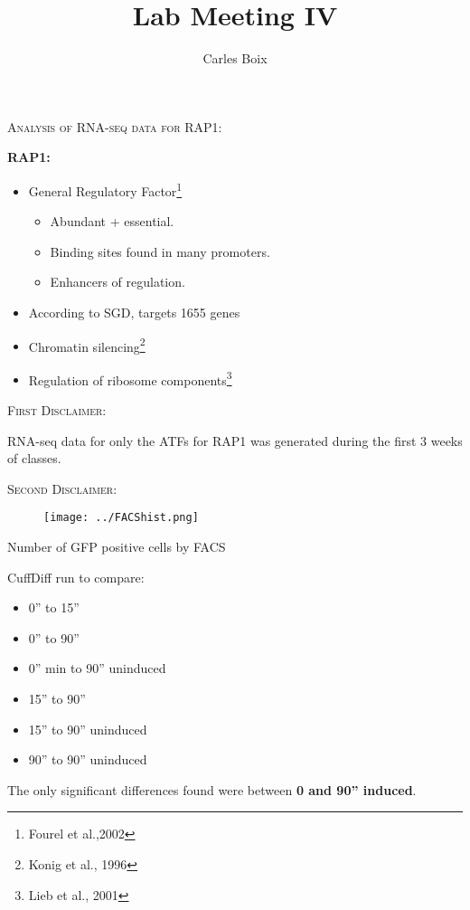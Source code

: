 \documentclass{beamer}
\title[Lab Meeting IV]{Lab Meeting IV}
\author{Carles Boix}
\begin{document}
\begin{frame}
 \begin{center}
        {\large \textsc{Analysis of RNA-seq data for RAP1:}}
    \end{center}

    \textbf{RAP1:}
    \begin{itemize}
        \item General Regulatory Factor\footnote{Fourel et al.,2002}
            \begin{itemize}
                \item Abundant + essential.
                \item Binding sites found in many promoters.
                \item Enhancers of regulation.
            \end{itemize}
        \item According to SGD, targets 1655 genes
        \item Chromatin silencing\footnote{Konig et al., 1996}
        \item Regulation of ribosome components\footnote{Lieb et al., 2001}
    \end{itemize}
\end{frame}
\begin{frame}
    \begin{center}
        {\Large \textsc{First Disclaimer:}}
    \end{center}
    RNA-seq data for only the ATFs for RAP1 was generated during the first 3 weeks of classes.
\end{frame}

\begin{frame}
    \begin{center}
        {\Large \textsc{Second Disclaimer:}}
    \end{center}
    \begin{figure}[ht!]
        \centering
        \texttt{[image: ../FACShist.png]}
        \label{fig:facs}
    \end{figure}
    \begin{center}
        Number of GFP positive cells by FACS
    \end{center}

\end{frame}

\begin{frame}
    CuffDiff run to compare:
    \begin{itemize}
        \item 0'' to 15''
        \item 0'' to 90''
        \item 0''   min to 90'' uninduced
        \item 15'' to 90''
        \item 15'' to 90'' uninduced
        \item 90'' to 90'' uninduced
    \end{itemize}
    \bigskip
    \pause
    The only significant differences found were between \textbf{0 and 90'' induced}.
\end{frame}
\end{document}
